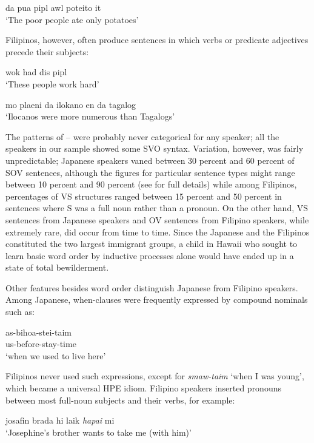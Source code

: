 \ea\label{ex:7}
da pua pipl awl poteito it \\
\glt `The poor people ate only potatoes'
\z

\noindent Filipinos, however, often produce sentences in which verbs or predicate adjectives precede their subjects:

\ea\label{ex:8}
 wok had dis pipl\\
\glt  `These people work hard'
\z

\ea\label{ex:9}
mo plaeni da ilokano en da tagalog\\
\glt  `Ilocanos were more numerous than Tagalogs'
\z

The patterns of -- were probably never categorical for any speaker; all the speakers in our sample showed some SVO syntax. Variation, however, was fairly unpredictable; Japanese speakers vaned between 30 percent and 60 percent of SOV sentences, although the figures for particular sentence types might range between 10 percent and 90 percent (see \citealt{BickertonEtAl1976b} for full details) while among Filipinos, percentages of VS structures ranged between 15 percent and 50 percent in sentences where S was a full noun rather than a pronoun. On the other hand, VS sentences from Japanese speakers and OV sentences from Filipino speakers, while extremely rare, did
occur from time to time. Since the Japanese and the Filipinos constituted the two largest immigrant groups, a child in Hawaii who sought to learn basic word order by inductive processes alone would have ended up in a state of total bewilderment.

Other features besides word order distinguish Japanese from
Filipino speakers. Among Japanese, when-clauses were frequently expressed by compound nominals such as:

\ea\label{ex:10}
\gll  as-bihoa-stei-taim\\
 us-before-stay-time \\
\glt  `when we used to live here'
\z

\noindent Filipinos never used such expressions, except for \textit{smaw-taim} `when I was young', which became a universal HPE idiom. Filipino speakers inserted pronouns between most full-noun subjects and their verbs, for example:

\ea\label{ex:11}
josafin brada hi laik \textit{hapai} mi\\
\glt   `Josephine's brother wants to take me (with him)' 
\z

